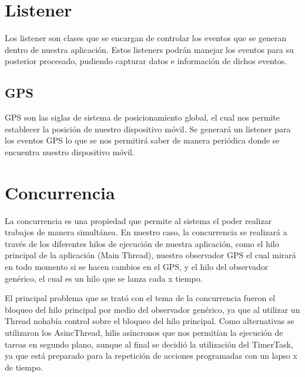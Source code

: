 \section{Listener}

Los listener son clases que se encargan de controlar los eventos que se generan dentro de nuestra aplicación.
Estos listeners podrán manejar los eventos para su posterior procesado, pudiendo capturar datos e información de dichos eventos.

\subsection{GPS}

GPS son las siglas de sistema de posicionamiento global, el cual nos permite establecer la posición de nuestro dispositivo móvil.
Se generará un listener para los eventos GPS lo que se nos permitirá saber de manera periódica donde se encuentra nuestro dispositivo móvil.

\section{Concurrencia}
La concurrencia es una propiedad que permite al sistema el poder realizar trabajos de manera simultánea. En nuestro caso, la concurrencia se realizará a través de los diferentes hilos de ejecución de nuestra aplicación, como el hilo principal de la aplicación (Main Thread), nuestro observador GPS el cual mirará en todo momento si se hacen cambios en el GPS, y el hilo del observador genérico, el cual es un hilo que se lanza cada x tiempo.

El principal problema que se trató con el tema de la concurrencia fueron el bloqueo del hilo principal por medio del observador genérico, ya que al utilizar un Thread nohabía control sobre el bloqueo del hilo principal. Como alternativas se utilizaron los AsincThread, hilis asíncronos que nos permitían la ejecución de tareas en segundo plano, aunque al final se decidió la utilización del TimerTask, ya que está preparado para la repetición de acciones programadas con un lapso x de tiempo.
